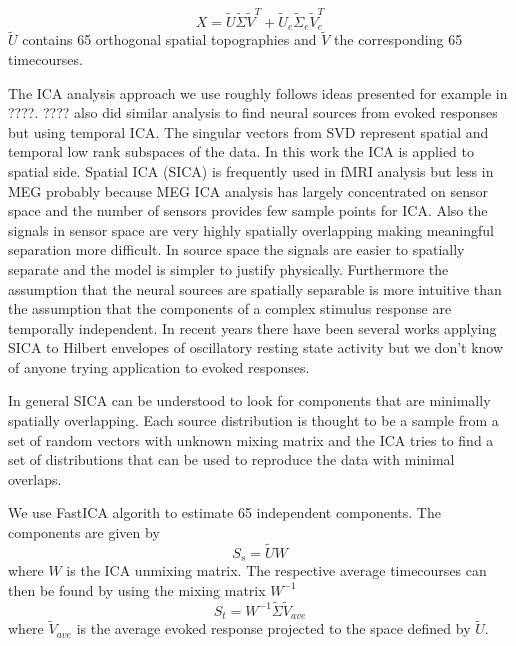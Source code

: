 \documentclass[]{article}
\begin{document}
\begin{equation}
X = \tilde{U} \tilde{\Sigma} \tilde{V}^T +  \tilde{U}_e \tilde{\Sigma}_e \tilde{V}_e^T
\end{equation}
$\tilde{U}$ contains 65 orthogonal spatial topographies and $\tilde{V}$ the corresponding 65 timecourses.


The ICA analysis approach we use roughly follows ideas presented for example in ????. ???? also did similar analysis to find neural sources from evoked responses but using temporal ICA. The singular vectors from SVD represent spatial and temporal low rank subspaces of the data. In this work the ICA is applied to spatial side. Spatial ICA (SICA) is frequently used in fMRI analysis but less in MEG probably because MEG ICA analysis has largely concentrated on sensor space and the number of sensors provides few sample points for ICA. Also the signals in sensor space are very highly spatially overlapping making meaningful separation more difficult. In source space the signals are easier to spatially separate and the model is simpler to justify physically. Furthermore the assumption that the neural sources are spatially separable is more intuitive than the assumption that the components of a complex stimulus response are temporally independent. In recent years there have been several works applying SICA to Hilbert envelopes of oscillatory resting state activity but we don't know of anyone trying application to evoked responses.

In general SICA can be understood to look for components that are minimally spatially overlapping. Each source distribution is thought to be a sample from a set of random vectors with unknown mixing matrix and the ICA tries to find a set of distributions that can be used to reproduce the data with minimal overlaps. %

We use FastICA algorith to estimate 65 independent components. The components are given by
\begin{equation}
S_s = \tilde{U} W  
\end{equation}
where $W$ is the ICA unmixing matrix. The respective average timecourses can then be found by using the mixing matrix $W^{-1}$
\begin{equation}
	S_t = W^{-1} \tilde{\Sigma} \tilde{V}_{ave}
\end{equation}
where $\tilde{V}_{ave}$ is the average evoked response projected to the space defined by $\tilde{U}$.
\end{document}
